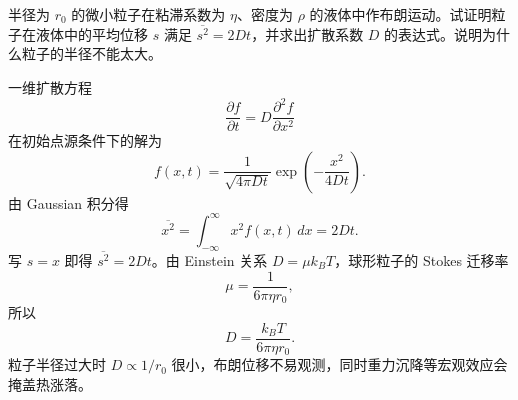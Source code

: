 \begin{question}
半径为 $r_0$ 的微小粒子在粘滞系数为 $\eta$、密度为 $\rho$ 的液体中作布朗运动。试证明粒子在液体中的平均位移 $s$ 满足 $\overline{s^2}=2Dt$，并求出扩散系数 $D$ 的表达式。说明为什么粒子的半径不能太大。
\begin{solution}
一维扩散方程
\[
\frac{\partial f}{\partial t}=D\frac{\partial^2 f}{\partial x^2}
\]
在初始点源条件下的解为
\[
f(x,t)=\frac1{\sqrt{4\pi Dt}}\exp\left(-\frac{x^2}{4Dt}\right).
\]
由 Gaussian 积分得
\[
\overline{x^2}=\int_{-\infty}^{\infty}x^2 f(x,t)\,dx=2Dt.
\]
写 $s=x$ 即得 $\overline{s^2}=2Dt$。由 Einstein 关系 $D=\mu k_BT$，球形粒子的 Stokes 迁移率
\[
\mu=\frac1{6\pi\eta r_0},
\]
所以
\[
D=\frac{k_BT}{6\pi\eta r_0}.
\]
粒子半径过大时 $D\propto1/r_0$ 很小，布朗位移不易观测，同时重力沉降等宏观效应会掩盖热涨落。
\end{solution}
\end{question}

